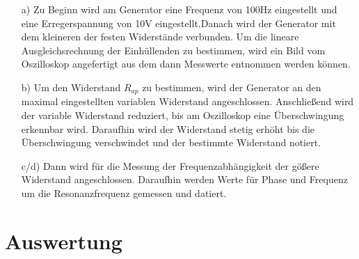 \begin{enumerate}

    \item[a)] \justifying Zu Beginn wird am Generator eine Frequenz von 100Hz 
    eingestellt und eine Erregerspannung von 10V eingestellt.Danach wird der 
    Generator mit dem kleineren der festen Widerstände verbunden.
    Um die lineare Ausgleichsrechnung der Einhüllenden zu bestimmen, wird
    ein Bild vom Oszilloskop angefertigt aus dem dann Messwerte entnommen werden
    können.

    \item[b)] \justifying Um den Widerstand $R_{ap}$ zu bestimmen, wird der Generator 
    an den maximal eingestellten variablen Widerstand angeschlossen. Anschließend wird 
    der variable Widerstand reduziert, bis am Oszilloskop eine Überschwingung erkennbar 
    wird. Daraufhin wird der Widerstand stetig erhöht bis die Überschwingung verschwindet 
    und der bestimmte Widerstand notiert.
  
    \item[c/d)] \justifying Dann wird für die Messung der Frequenzabhängigkeit
                          der gößere Widerstand angeschlossen.
                          Daraufhin werden Werte für Phase und Frequenz um die 
                          Resonanzfrequenz gemessen und datiert.
  
    

  \end{enumerate}


\section{Auswertung}\justifying


